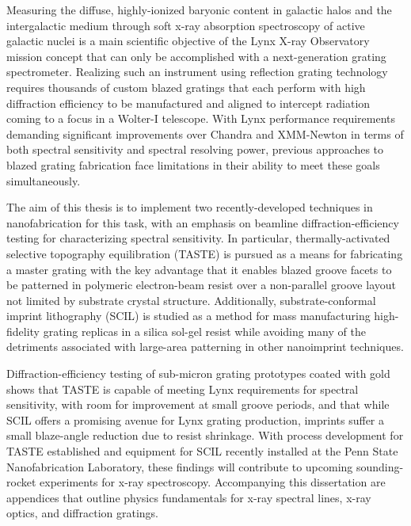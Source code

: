 
\vspace{-0.3in}

Measuring the diffuse, highly-ionized baryonic content in galactic halos and the intergalactic medium through soft x-ray absorption spectroscopy of active galactic nuclei is a main scientific objective of the Lynx X-ray Observatory mission concept that can only be accomplished with a next-generation grating spectrometer. 
Realizing such an instrument using reflection grating technology requires thousands of custom blazed gratings that each perform with high diffraction efficiency to be manufactured and aligned to intercept radiation coming to a focus in a Wolter-I telescope. 
With Lynx performance requirements demanding significant improvements over Chandra and XMM-Newton in terms of both spectral sensitivity and spectral resolving power, previous approaches to blazed grating fabrication face limitations in their ability to meet these goals simultaneously. 

The aim of this thesis is to implement two recently-developed techniques in nanofabrication for this task, with an emphasis on beamline diffraction-efficiency testing for characterizing spectral sensitivity. 
In particular, thermally-activated selective topography equilibration (TASTE) is pursued as a means for fabricating a master grating with the key advantage that it enables blazed groove facets to be patterned in polymeric electron-beam resist over a non-parallel groove layout not limited by substrate crystal structure. 
Additionally, substrate-conformal imprint lithography (SCIL) is studied as a method for mass manufacturing high-fidelity grating replicas in a silica sol-gel resist while avoiding many of the detriments associated with large-area patterning in other nanoimprint techniques. 

Diffraction-efficiency testing of sub-micron grating prototypes coated with gold shows that TASTE is capable of meeting Lynx requirements for spectral sensitivity, with room for improvement at small groove periods, and that while SCIL offers a promising avenue for Lynx grating production, imprints suffer a small blaze-angle reduction due to resist shrinkage. 
With process development for TASTE established and equipment for SCIL recently installed at the Penn State Nanofabrication Laboratory, these findings will contribute to upcoming sounding-rocket experiments for x-ray spectroscopy. 
Accompanying this dissertation are appendices that outline physics fundamentals for x-ray spectral lines, x-ray optics, and diffraction gratings. 
